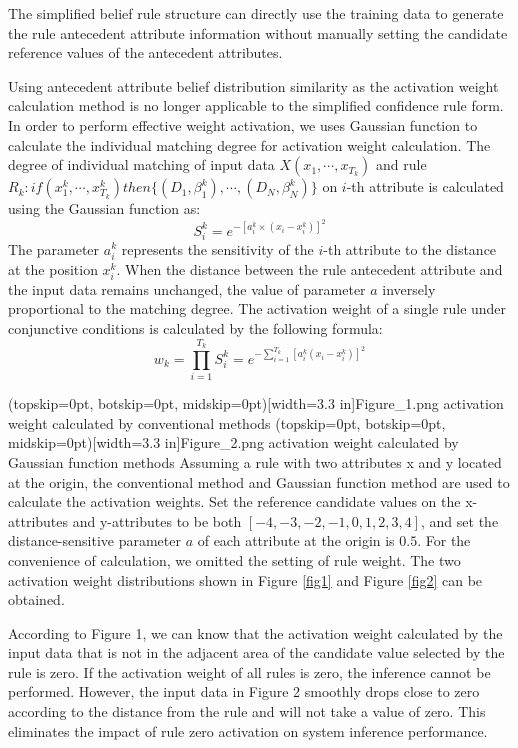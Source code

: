 \documentclass{ieeeaccess}
\begin{document}
The simplified belief rule structure can directly use the training data to generate the rule antecedent attribute information without manually setting the candidate reference values of the antecedent attributes.

Using antecedent attribute belief distribution similarity as the activation weight calculation method is no longer applicable to the simplified confidence rule form. In order to perform effective weight activation,
we uses Gaussian function to calculate the individual matching degree for activation weight calculation.
The degree of individual matching of input data $X(x_1,\cdots,x_{T_k})$ and rule $R_k:if(x_1^k , \cdots , x_{T_k}^k)then\{(D_1,\beta_1^k),\cdots,(D_N,\beta_N^k)\}$ on $i$-th attribute is calculated using the Gaussian function as:
\begin{equation}
    S_i^k=e^{-[a_i^k\times(x_i-x_i^k)]^2}
\end{equation}
The parameter $a_i^k$ represents the sensitivity of the $i$-th attribute to the distance at the position $x_i^k$. When the distance between the rule antecedent attribute and the input data remains unchanged,
the value of parameter $a$ inversely proportional to the matching degree.
The activation weight of a single rule under conjunctive conditions is calculated by the following formula:
\begin{equation}
    w_k=\prod_{i=1}^{T_k}S_i^k=e^{-\sum_{i=1}^{T_k}[a_i^k(x_i-x_i^k)]^2}
\end{equation}


\Figure[!t](topskip=0pt, botskip=0pt, midskip=0pt)[width=3.3 in]{Figure_1.png}
{activation weight calculated by conventional methods\label{fig1}}
\Figure[!t](topskip=0pt, botskip=0pt, midskip=0pt)[width=3.3 in]{Figure_2.png}
{activation weight calculated by Gaussian function methods\label{fig2}}
Assuming a rule with two attributes x and y located at the origin, the conventional method and Gaussian function method are used to calculate the activation weights.
Set the reference candidate values on the x-attributes and y-attributes to be both $[-4,-3,-2,-1,0,1,2,3,4]$,
and set the distance-sensitive parameter $a$ of each attribute at the origin is $0.5$.
For the convenience of calculation, we omitted the setting of rule weight.
The two activation weight distributions shown in Figure \ref{fig1} and Figure \ref{fig2} can be obtained.

According to Figure 1, we can know that the activation weight calculated by the input data that is not in the adjacent area of the candidate value selected by the rule is zero.
If the activation weight of all rules is zero, the inference cannot be performed.
However, the input data in Figure 2 smoothly drops close to zero according to the distance from the rule and will not take a value of zero.
This eliminates the impact of rule zero activation on system inference performance.
\end{document}
